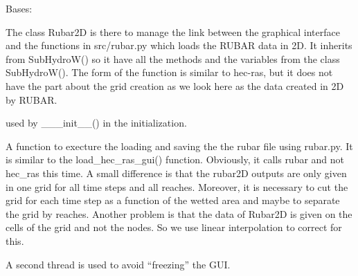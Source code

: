 \documentclass[letterpaper,10pt,english]{sphinxmanual}
\begin{document}

\begin{fulllineitems}
\label{\detokenize{index:src_GUI.hydro_GUI_2.Rubar2D}}
Bases: {\hyperref[\detokenize{index:src_GUI.hydro_GUI_2.SubHydroW}]{}}

The class Rubar2D is there to manage the link between the graphical interface and the functions in src/rubar.py
which loads the RUBAR data in 2D. It inherits from SubHydroW() so it have all the methods and the variables from
the class SubHydroW(). The form of the function is similar to hec-ras, but it does not have the part about the grid
creation as we look here as the data created in 2D by RUBAR.

\begin{fulllineitems}
\label{\detokenize{index:src_GUI.hydro_GUI_2.Rubar2D.init_iu}}
used by \_\_\_init\_\_() in the initialization.

\end{fulllineitems}


\begin{fulllineitems}
\label{\detokenize{index:src_GUI.hydro_GUI_2.Rubar2D.load_rubar}}
A function to execture the loading and saving the the rubar file using rubar.py. It is similar to the
load\_hec\_ras\_gui() function. Obviously, it calls rubar and not hec\_ras this time. A small difference is that
the rubar2D outputs are only given in one grid for all time steps and all reaches. Moreover, it is
necessary to cut the grid for each time step as a function of the wetted area and maybe to separate the
grid by reaches.  Another problem is that the data of Rubar2D is given on the cells of the grid and not the
nodes. So we use linear interpolation to correct for this.

A second thread is used to avoid ``freezing'' the GUI.

\end{fulllineitems}



\end{fulllineitems}
\end{document}
